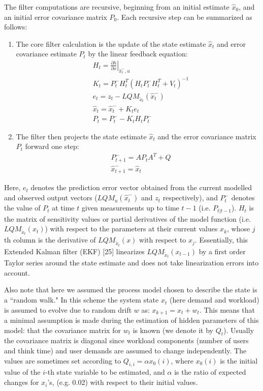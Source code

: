 The filter computations are recursive, beginning from an initial estimate $\hat{x}_0$, and an initial error covariance matrix $P_0$.
Each recursive step can be summarized as follows: 
\begin{enumerate}
\item  The core filter calculation is the update of the state estimate $\hat{x}_t$ and error covariance estimate $P_t$ by the linear feedback equation:
 \begin{align} 
& H_{t} = \left . \frac{\partial h}{\partial x } \right \vert_{\hat{x}_t^-,u} \\
& K_t  =P_t^- H_t^T (H_t P_t^- H_t^T+ V_t )^{-1} \\ 
& e_t   = z_t  - LQM_{\tilde{x}_t}(\hat{x}_t^-)  \label{eq:observation-error} \\  
& \hat{x}_t = \hat{x}_t^- + K_t e_t   \\
& P_t=P_t^- - K_t H_t P_t^-       
 \end{align}
\item The filter then projects the state estimate $\hat{x}_t$ and the error covariance matrix $P_t$ forward one step:  \begin{align}
 & P_{t+1}^-  = AP_tA^T+Q \\
 & \hat{x}_{t+1}^-=\hat{x}_t
 \end{align} 
\end{enumerate}

 Here, $e_t$ denotes the prediction error vector obtained from the current modelled and observed output vectors ($LQM_u(\hat{x}_t^-)$ and $z_t$ respectively), and $P_t^- $ denotes the value of $P_t$  at time $t$ given measurements up to time $t-1$ (i.e. $P_{t|t-1}$).  
 $H_t$ is the matrix of sensitivity values or partial derivatives of the model function (i.e. $LQM_{\tilde{x}_t}(x_t)$) with respect to the parameters at their current values $x_{k}$,  whose $j$th column is the derivative of $LQM_{\tilde{x}_t}(x)$ with respect to $x_j$. 
 Essentially, this Extended Kalman filter (EKF) [25] linearizes $LQM_{\tilde{x}_t}(x_{t-1})$ by a first order Taylor series around the state estimate and does not take linearization errors into account. 

 Also note that here we assumed the process model chosen to describe the state is a ``random walk."  In this scheme the system state $x_t$ (here demand and workload) is assumed to evolve due to random drift $w$ as: $x_{k+1}= x_t+ w_t$. This means that a minimal assumption is made during the estimation of hidden parameters of this model: that the covariance matrix for $w_t$ is known (we denote it by $Q_t$). 
 Usually the covariance matrix is diagonal since workload components (number of users and think time) and user demands are assumed to change independently. The values are sometimes set according to $Q_{i,i} = \alpha  x_0(i)$, where $x_0(i)$ is the initial value of the $i$-th state variable to be estimated, and $\alpha$ is the ratio of expected changes for $x_i$'s,  (e.g. 0.02) with respect to their initial values.   

